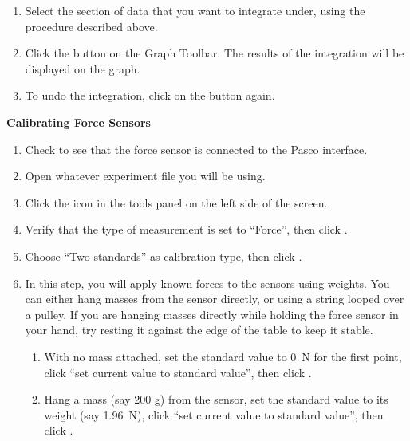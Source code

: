 \begin{enumerate}
\item Select the section of data that you want to integrate under, using the procedure described above.
\item Click the  button on the Graph Toolbar.
The results of the integration will be displayed on the graph.
\item To undo the integration, click on the  button again.
\end{enumerate}

\pagebreak[2]

\textbf{Calibrating Force Sensors}

\begin{enumerate}
\item Check to see that the force sensor is connected to the Pasco interface.

\item Open whatever experiment file you will be using.

\item Click the  icon in the tools panel on the left side of the screen.

\item Verify that the type of measurement is set to ``Force'', then click .

\item Choose ``Two standards'' as calibration type, then click .

\item In this step, you will apply known forces to the sensors using weights.  You can either hang masses from the sensor directly, or using a string looped over a pulley.  If you are hanging masses directly while holding the force sensor in your hand, try resting it against the edge of the table to keep it stable.

\begin{enumerate}

\item With no mass attached, set the standard value to 0~N for the first point, click ``set current value to standard value'', then click .

\item Hang a mass (say 200 g) from the sensor, set the standard value to its weight (say 1.96~N), click ``set current value to standard value'', then click .

\end{enumerate}


\end{enumerate}
